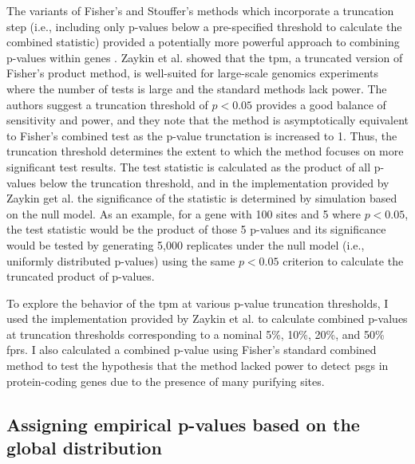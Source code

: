 The variants of Fisher's and Stouffer's methods which incorporate a
truncation step (i.e., including only p-values below a pre-specified
threshold to calculate the combined statistic) provided a potentially
more powerful approach to combining \sw p-values within genes
\citep{Darlington2000,Zaykin2002,Zaykin2007}. Zaykin et
al. \citeyearpar{Zaykin2002,Zaykin2007} showed that the \ac{tpm}, a
truncated version of Fisher's product method, is well-suited for
large-scale genomics experiments where the number of tests is large
and the standard methods lack power. The authors suggest a truncation
threshold of $p<0.05$ provides a good balance of sensitivity and
power, and they note that the method is asymptotically equivalent to
Fisher's combined test as the p-value trunctation is increased to
1. Thus, the truncation threshold determines the extent to which the
method focuses on more significant test results. The test statistic is
calculated as the product of all p-values below the truncation
threshold, and in the implementation provided by Zaykin get
al. \citeyearpar{Zaykin2002} the significance of the statistic is
determined by simulation based on the null model. As an example, for a
gene with 100 sites and 5 where $p<0.05$, the test statistic would be
the product of those 5 p-values and its significance would be tested
by generating 5,000 replicates under the null model (i.e., uniformly
distributed p-values) using the same $p<0.05$ criterion to calculate
the truncated product of p-values.

To explore the behavior of the \ac{tpm} at various p-value truncation
thresholds, I used the implementation provided by Zaykin et
al. \citeyearpar{Zaykin2002} to calculate combined p-values at
truncation thresholds corresponding to a nominal 5\%, 10\%, 20\%, and
50\% \sw \acp{fpr}. I also calculated a combined p-value using
Fisher's standard combined method to test the hypothesis that the
method lacked power to detect \acp{psg} in protein-coding genes due to
the presence of many purifying sites.

\subsection{Assigning empirical p-values based on the global \sw distribution}


